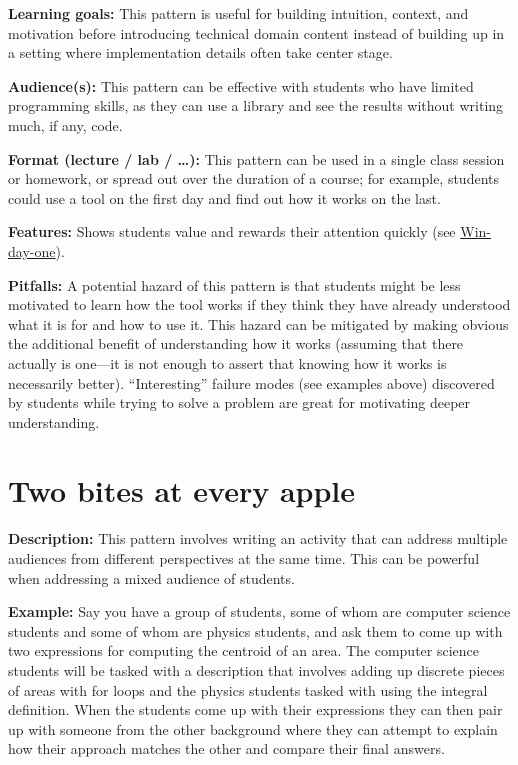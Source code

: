 \documentclass[]{book}
\begin{document}
\textbf{Learning goals:}
This pattern is useful for building intuition, context, and motivation before
introducing technical domain content instead of building up in a setting where
implementation details often take center stage.

\textbf{Audience(s):}
This pattern can be effective with students who have limited programming skills,
as they can use a library and see the results without writing much, if any, code.

\textbf{Format (lecture / lab / \ldots):}
This pattern can be used in a single class session or homework, or spread out over
the duration of a course; for example, students could use a tool on the first day
and find out how it works on the last.

\textbf{Features:}
Shows students value and rewards their attention quickly (see \protect\hyperlink{win-day-one}{Win-day-one}).

\textbf{Pitfalls:}
A potential hazard of this pattern is that students might be less motivated to
learn how the tool works if they think they have already understood what it is
for and how to use it. This hazard can be mitigated by making obvious the additional
benefit of understanding how it works (assuming that there actually is one---it is
not enough to assert that knowing how it works is necessarily better).
``Interesting'' failure modes (see examples above) discovered by students while
trying to solve a problem are great for motivating deeper understanding.

\hypertarget{two-bites-at-every-apple}{%
\section{Two bites at every apple}\label{two-bites-at-every-apple}}

\textbf{Description:}
This pattern involves writing an activity that can address multiple audiences
from different perspectives at the same time. This can be powerful when
addressing a mixed audience of students.

\textbf{Example:}
Say you have a group of students, some of whom are computer science students
and some of whom are physics students, and ask them to come up with two
expressions for computing the centroid of an area. The computer science
students will be tasked with a description that involves adding up discrete
pieces of areas with for loops and the physics students tasked with using the
integral definition. When the students come up with their expressions they can
then pair up with someone from the other background where they can attempt to
explain how their approach matches the other and compare their final answers.
\end{document}
